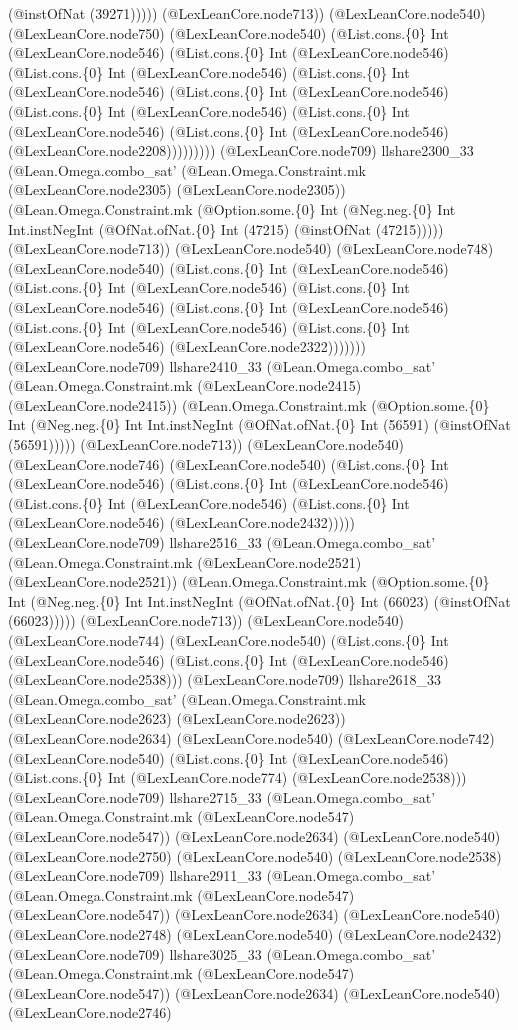 \documentclass[11pt]{article}
\begin{document}
(@instOfNat (39271))))) (@LexLeanCore.node713)) (@LexLeanCore.node540) (@LexLeanCore.node750) (@LexLeanCore.node540) (@List.cons.\{0\} Int (@LexLeanCore.node546) (@List.cons.\{0\} Int (@LexLeanCore.node546) (@List.cons.\{0\} Int (@LexLeanCore.node546) (@List.cons.\{0\} Int (@LexLeanCore.node546) (@List.cons.\{0\} Int (@LexLeanCore.node546) (@List.cons.\{0\} Int (@LexLeanCore.node546) (@List.cons.\{0\} Int (@LexLeanCore.node546) (@List.cons.\{0\} Int (@LexLeanCore.node546) (@LexLeanCore.node2208))))))))) (@LexLeanCore.node709) llshare2300\_33 (@Lean.Omega.combo\_sat' (@Lean.Omega.Constraint.mk (@LexLeanCore.node2305) (@LexLeanCore.node2305)) (@Lean.Omega.Constraint.mk (@Option.some.\{0\} Int (@Neg.neg.\{0\} Int Int.instNegInt (@OfNat.ofNat.\{0\} Int (47215) (@instOfNat (47215))))) (@LexLeanCore.node713)) (@LexLeanCore.node540) (@LexLeanCore.node748) (@LexLeanCore.node540) (@List.cons.\{0\} Int (@LexLeanCore.node546) (@List.cons.\{0\} Int (@LexLeanCore.node546) (@List.cons.\{0\} Int (@LexLeanCore.node546) (@List.cons.\{0\} Int (@LexLeanCore.node546) (@List.cons.\{0\} Int (@LexLeanCore.node546) (@List.cons.\{0\} Int (@LexLeanCore.node546) (@LexLeanCore.node2322))))))) (@LexLeanCore.node709) llshare2410\_33 (@Lean.Omega.combo\_sat' (@Lean.Omega.Constraint.mk (@LexLeanCore.node2415) (@LexLeanCore.node2415)) (@Lean.Omega.Constraint.mk (@Option.some.\{0\} Int (@Neg.neg.\{0\} Int Int.instNegInt (@OfNat.ofNat.\{0\} Int (56591) (@instOfNat (56591))))) (@LexLeanCore.node713)) (@LexLeanCore.node540) (@LexLeanCore.node746) (@LexLeanCore.node540) (@List.cons.\{0\} Int (@LexLeanCore.node546) (@List.cons.\{0\} Int (@LexLeanCore.node546) (@List.cons.\{0\} Int (@LexLeanCore.node546) (@List.cons.\{0\} Int (@LexLeanCore.node546) (@LexLeanCore.node2432))))) (@LexLeanCore.node709) llshare2516\_33 (@Lean.Omega.combo\_sat' (@Lean.Omega.Constraint.mk (@LexLeanCore.node2521) (@LexLeanCore.node2521)) (@Lean.Omega.Constraint.mk (@Option.some.\{0\} Int (@Neg.neg.\{0\} Int Int.instNegInt (@OfNat.ofNat.\{0\} Int (66023) (@instOfNat (66023))))) (@LexLeanCore.node713)) (@LexLeanCore.node540) (@LexLeanCore.node744) (@LexLeanCore.node540) (@List.cons.\{0\} Int (@LexLeanCore.node546) (@List.cons.\{0\} Int (@LexLeanCore.node546) (@LexLeanCore.node2538))) (@LexLeanCore.node709) llshare2618\_33 (@Lean.Omega.combo\_sat' (@Lean.Omega.Constraint.mk (@LexLeanCore.node2623) (@LexLeanCore.node2623)) (@LexLeanCore.node2634) (@LexLeanCore.node540) (@LexLeanCore.node742) (@LexLeanCore.node540) (@List.cons.\{0\} Int (@LexLeanCore.node546) (@List.cons.\{0\} Int (@LexLeanCore.node774) (@LexLeanCore.node2538))) (@LexLeanCore.node709) llshare2715\_33 (@Lean.Omega.combo\_sat' (@Lean.Omega.Constraint.mk (@LexLeanCore.node547) (@LexLeanCore.node547)) (@LexLeanCore.node2634) (@LexLeanCore.node540) (@LexLeanCore.node2750) (@LexLeanCore.node540) (@LexLeanCore.node2538) (@LexLeanCore.node709) llshare2911\_33 (@Lean.Omega.combo\_sat' (@Lean.Omega.Constraint.mk (@LexLeanCore.node547) (@LexLeanCore.node547)) (@LexLeanCore.node2634) (@LexLeanCore.node540) (@LexLeanCore.node2748) (@LexLeanCore.node540) (@LexLeanCore.node2432) (@LexLeanCore.node709) llshare3025\_33 (@Lean.Omega.combo\_sat' (@Lean.Omega.Constraint.mk (@LexLeanCore.node547) (@LexLeanCore.node547)) (@LexLeanCore.node2634) (@LexLeanCore.node540) (@LexLeanCore.node2746) 
\end{document}

